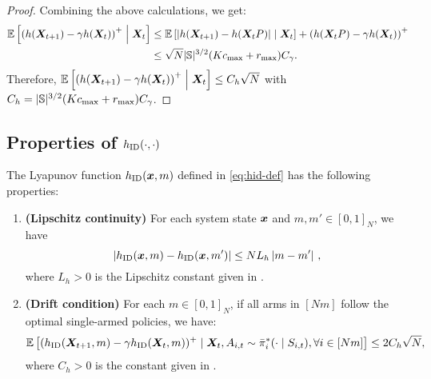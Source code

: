 \begin{proof}
Combining the above calculations, we get:
\begin{align*}
    \mathbb{E}\left[\left(h({\bm{X}}_{t+1})-\gamma h({\bm{X}}_t)\right)^+\;\middle|\;{\bm{X}}_t\right] &\leq \mathbb{E}\left[\left\lvert h({\bm{X}}_{t+1})-h({\bm{X}}_tP)\right\rvert\;\middle|\;{\bm{X}}_t\right]+ \left(h({\bm{X}}_tP)-\gamma h({\bm{X}}_t)\right)^+\\
    &\leq \sqrt{N}\lvert\mathbb{S}\rvert^{3/2}(Kc_{\max}+r_{\max})C_{\gamma}. 
\end{align*}
Therefore, $\mathbb{E}\left[\left(h({\bm{X}}_{t+1})-\gamma h({\bm{X}}_t)\right)^+\;\middle|\;{\bm{X}}_t\right]\leq C_h \sqrt{N}$ with $C_h = \lvert\mathbb{S}\rvert^{3/2}(Kc_{\max}+r_{\max})C_{\gamma}$. 
\end{proof}


\subsection{Properties of $h_{\textnormal{ID}}(\cdot,\cdot)$}
\label{sec:properties-hID}

\begin{lemma}\label{lem:hID drift}
The Lyapunov function $h_{\textnormal{ID}}(\bm{x}, m)$ defined in \eqref{eq:hid-def} has the following properties: 
\begin{enumerate}
    \item \textbf{(Lipschitz continuity)} For each system state $\bm{x}$ and $m, m'\in[0,1]_N$, we have
    \begin{equation}
        \label{eq:hid-drift-condition}
        \left\lvert h_{\textnormal{ID}}(\bm{x},m)-h_{\textnormal{ID}}(\bm{x},m')\right\rvert\leq NL_h\left\lvert m-m'\right\rvert\,,
    \end{equation}
    where $L_h > 0$ is the Lipschitz constant given in . 
    \item \textbf{(Drift condition)} 
        For each $m\in[0,1]_N$, if all arms in $[Nm]$ follow the optimal single-armed policies, we have: 
        \begin{align*}
            \mathbb{E}\left[(h_{\textnormal{ID}}({\bm{X}}_{t+1},m)-\gamma h_{\textnormal{ID}}({\bm{X}}_t,m))^+\mid{\bm{X}}_t, A_{i,t}\sim\Bar{\pi}_i^*(\cdot\mid S_{i,t}),\forall i \in [Nm]\right]\leq 2C_h\sqrt{N},
        \end{align*}
        where $C_h > 0$ is the constant given in .  
\end{enumerate}
\end{lemma}


